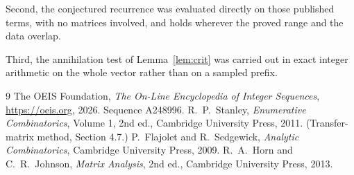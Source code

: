 \documentclass[11pt,a4paper]{article}
\theoremstyle{plain}
\theoremstyle{definition}
\begin{document}
Second, the conjectured recurrence was evaluated directly on those published terms, with no
matrices involved, and holds wherever the proved range and the data overlap.

Third, the annihilation test of Lemma~\ref{lem:crit} was carried out in exact integer
arithmetic on the whole vector rather than on a sampled prefix.

\begin{thebibliography}{9}
 The OEIS Foundation, \emph{The On-Line Encyclopedia of Integer
Sequences}, \url{https://oeis.org}, 2026. Sequence A248996.
 R.~P.~Stanley, \emph{Enumerative Combinatorics}, Volume 1, 2nd ed.,
Cambridge University Press, 2011. (Transfer-matrix method, Section 4.7.)
 P.~Flajolet and R.~Sedgewick, \emph{Analytic Combinatorics}, Cambridge
University Press, 2009.
 R.~A.~Horn and C.~R.~Johnson, \emph{Matrix Analysis}, 2nd ed., Cambridge
University Press, 2013.
\end{thebibliography}
\end{document}
